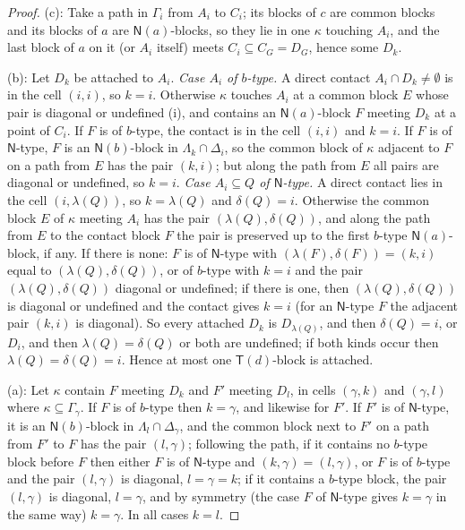 \documentclass[11pt]{amsart}
\theoremstyle{definition}
\newcommand{\T}{\mathsf{T}}
\newcommand{\N}{\mathsf{N}}
\begin{document}
\begin{proof}
(c): Take a path in $\Gamma_i$ from $A_i$ to $C_i$; its blocks of $c$ are common blocks and its blocks of $a$ are $\N(a)$-blocks, so they lie in one $\kappa$ touching $A_i$, and the last block of $a$ on it (or $A_i$ itself) meets $C_i\subseteq C_G=D_G$, hence some $D_k$.

(b): Let $D_k$ be attached to $A_i$. \emph{Case $A_i$ of $b$-type.} A direct contact $A_i\cap D_k\ne\emptyset$ is in the cell $(i,i)$, so $k=i$. Otherwise $\kappa$ touches $A_i$ at a common block $E$ whose pair is diagonal or undefined (i), and contains an $\N(a)$-block $F$ meeting $D_k$ at a point of $C_i$. If $F$ is of $b$-type, the contact is in the cell $(i,i)$ and $k=i$. If $F$ is of $\N$-type, $F$ is an $\N(b)$-block in $\Lambda_k\cap\Delta_i$, so the common block of $\kappa$ adjacent to $F$ on a path from $E$ has the pair $(k,i)$; but along the path from $E$ all pairs are diagonal or undefined, so $k=i$. \emph{Case $A_i\subseteq Q$ of $\N$-type.} A direct contact lies in the cell $(i,\lambda(Q))$, so $k=\lambda(Q)$ and $\delta(Q)=i$. Otherwise the common block $E$ of $\kappa$ meeting $A_i$ has the pair $(\lambda(Q),\delta(Q))$, and along the path from $E$ to the contact block $F$ the pair is preserved up to the first $b$-type $\N(a)$-block, if any. If there is none: $F$ is of $\N$-type with $(\lambda(F),\delta(F))=(k,i)$ equal to $(\lambda(Q),\delta(Q))$, or of $b$-type with $k=i$ and the pair $(\lambda(Q),\delta(Q))$ diagonal or undefined; if there is one, then $(\lambda(Q),\delta(Q))$ is diagonal or undefined and the contact gives $k=i$ (for an $\N$-type $F$ the adjacent pair $(k,i)$ is diagonal). So every attached $D_k$ is $D_{\lambda(Q)}$, and then $\delta(Q)=i$, or $D_i$, and then $\lambda(Q)=\delta(Q)$ or both are undefined; if both kinds occur then $\lambda(Q)=\delta(Q)=i$. Hence at most one $\T(d)$-block is attached.

(a): Let $\kappa$ contain $F$ meeting $D_k$ and $F'$ meeting $D_l$, in cells $(\gamma,k)$ and $(\gamma,l)$ where $\kappa\subseteq\Gamma_\gamma$. If $F$ is of $b$-type then $k=\gamma$, and likewise for $F'$. If $F'$ is of $\N$-type, it is an $\N(b)$-block in $\Lambda_l\cap\Delta_\gamma$, and the common block next to $F'$ on a path from $F'$ to $F$ has the pair $(l,\gamma)$; following the path, if it contains no $b$-type block before $F$ then either $F$ is of $\N$-type and $(k,\gamma)=(l,\gamma)$, or $F$ is of $b$-type and the pair $(l,\gamma)$ is diagonal, $l=\gamma=k$; if it contains a $b$-type block, the pair $(l,\gamma)$ is diagonal, $l=\gamma$, and by symmetry (the case $F$ of $\N$-type gives $k=\gamma$ in the same way) $k=\gamma$. In all cases $k=l$.
\end{proof}
\end{document}
